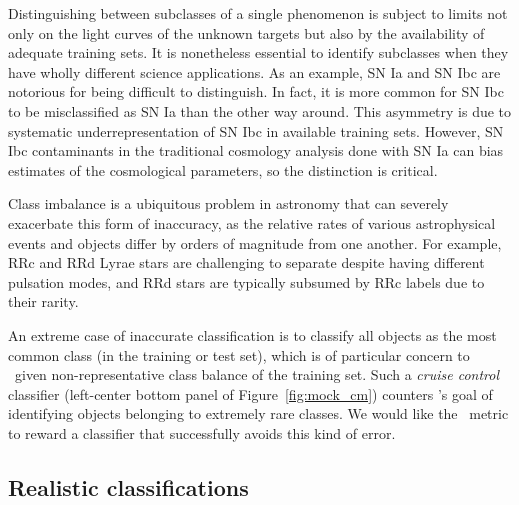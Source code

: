 Distinguishing between subclasses of a single phenomenon is subject to limits not only on the light curves of the unknown targets but also by the availability of adequate training sets.
It is nonetheless essential to identify subclasses when they have wholly different science applications.
As an example, SN Ia and SN Ibc are notorious for being difficult to distinguish.
In fact, it is more common for SN Ibc to be misclassified as SN Ia than the other way around.
This asymmetry is due to systematic underrepresentation of SN Ibc in available training sets.
However, SN Ibc contaminants in the traditional cosmology analysis done with SN Ia can bias estimates of the cosmological parameters, so the distinction is critical.

Class imbalance is a ubiquitous problem in astronomy that can severely exacerbate this form of inaccuracy, as the relative rates of various astrophysical events and objects differ by orders of magnitude from one another.
For example, RRc and RRd Lyrae stars are challenging to separate despite having different pulsation modes, and RRd stars are typically subsumed by RRc labels due to their rarity.

An extreme case of inaccurate classification is to classify all objects as the most common class (in the training or test set), which is of particular concern to \plasticc\ given non-representative class balance of the training set.
Such a \textit{cruise control} classifier (left-center bottom panel of Figure~\ref{fig:mock_cm}) counters \plasticc's goal of identifying objects belonging to extremely rare classes.
We would like the \plasticc\ metric to reward a classifier that successfully avoids this kind of error.

\subsection{Realistic classifications}
\label{sec:realdata}

